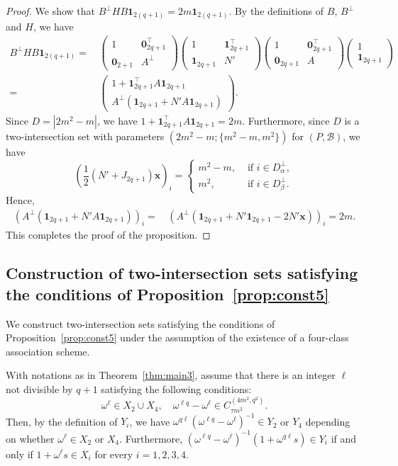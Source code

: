 \documentclass[ALCO,ThmDefs,Unicode]{cedram}
\newcommand*\tra{\top}
\newcommand*{\un}{\mathbf{1}}
\newcommand*{\bfx}{\mathbf{x}}
\newcommand*{\bfo}{\mathbf{0}}
\begin{document}
\begin{proof}
We show that $B^\perp H B\un_{2(q+1)}=2m \un_{2(q+1)}$. By the definitions of $B$, $B^\perp$ and $H$, we have
\begin{align*}
B^\perp H B\un_{2(q+1)}=&\,
\begin{pmatrix} 1 & \bfo_{2q+1}^\tra \\
\bfo_{2+1} & A^\perp
\end{pmatrix}
\begin{pmatrix} 1 & \un_{2q+1}^\tra \\
\un_{2q+1} & N'
\end{pmatrix}
\begin{pmatrix} 1 & \bfo_{2q+1}^\tra \\
\bfo_{2q+1} & A
\end{pmatrix}
\begin{pmatrix} 1 \\ \un_{2q+1}
\end{pmatrix}\\
=&\,
\begin{pmatrix}
1+\un_{2q+1}^\tra A \un_{2q+1}\\
A^\perp(\un_{2q+1}+N'A\un_{2q+1})
\end{pmatrix}.
\end{align*}
Since $D=|2m^2-m|$, we have $1+\un_{2q+1}^\tra A \un_{2q+1}=2m$. Furthermore, since $D$ is a two-intersection set with parameters $(2m^2-m;\{m^2-m,m^2\})$ for $(P,{\mathcal B})$, we have
\[
\left(\frac{1}{2}(N'+J_{2q+1})\bfx\right)_i=
\begin{cases}
m^2-m,& \text{ if } i\in D_{\alpha}^\perp,\\
m^2,& \text{ if } i\in D_{\beta}^\perp.
\end{cases}
\]
Hence,
\begin{align*}
\left(A^\perp (\un_{2q+1}+N'A\un_{2q+1})\right)_i=&\,
\left(A^\perp (\un_{2q+1}+N'\un_{2q+1}-2N'\bfx)\right)_i =2m.
\end{align*}
This completes the proof of the proposition.
\end{proof}

\subsection{Construction of two-intersection sets satisfying the conditions of Proposition~\ref{prop:const5}}\label{sec:6.2}
We construct two-intersection sets satisfying the conditions of Proposition~\ref{prop:const5} under the assumption of the existence of a four-class association scheme.

With notations as in Theorem~\ref{thm:main3}, assume that there is an integer $\ell$ not divisible by $q+1$ satisfying the following conditions:
\begin{equation}\label{eq:lext}
\omega^{\ell}\in X_2\cup X_4,\quad \omega^{\ell q}-\omega^\ell\in C_{\tau m^2}^{(4m^2,q^2)}.
\end{equation}
Then, by the definition of $Y_i$, we have $\omega^{q\ell}(\omega^{\ell q}-\omega^\ell)^{-1}\in Y_2$ or $Y_4$ depending on whether $\omega^{\ell}\in X_2$ or $X_4$. Furthermore, $(\omega^{\ell q}-\omega^\ell)^{-1}(1+\omega^{q\ell}s)\in Y_i$ if and only if $1+\omega^\ell s \in X_i$ for every $i=1,2,3,4$.
\end{document}
